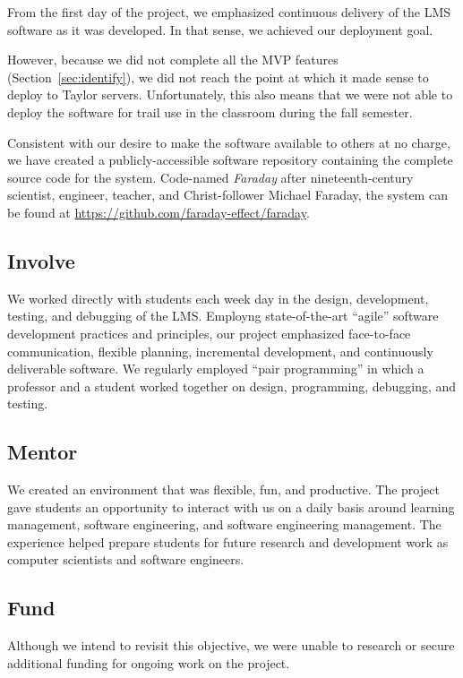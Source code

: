 \documentclass{article}
\begin{document}
From the first day of the project,
we emphasized continuous delivery
of the LMS software as it was developed.
In that sense,
we achieved our deployment goal.

However,
because we did not complete all the MVP features
(Section~\ref{sec:identify}),
we did not reach the point at which
it made sense to deploy to Taylor servers.
Unfortunately,
this also means that we were not able to
deploy the software for trail use in the classroom
during the fall semester.

Consistent with our desire to make the software
available to others at no charge,
we have created a publicly-accessible software repository
containing the complete source code
for the system.
Code-named \emph{Faraday} after nineteenth-century
scientist, engineer, teacher, and Christ-follower Michael Faraday,
the system can be found at \url{https://github.com/faraday-effect/faraday}.

\subsection{Involve}

We worked directly with students
each week day
in the design, development, testing, and debugging
of the LMS.
Employng state-of-the-art
``agile'' software development
practices and principles,
our project emphasized
face-to-face communication,
flexible planning,
incremental development,
and continuously deliverable software.
We regularly employed ``pair programming''
in which a professor and a student
worked together on design, programming,
debugging, and testing.

\subsection{Mentor}

We created an environment that was
flexible, fun, and productive.
The project gave students an opportunity to interact
with us on a daily basis around
learning management,
software engineering,
and software engineering management.
The experience
helped prepare students
for future research and development work
as computer scientists and software engineers.

\subsection{Fund}

Although we intend to revisit this objective,
we were unable to research or secure
additional funding for ongoing work on the project.
\end{document}
